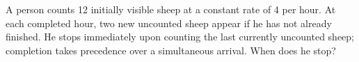 A person counts 12 initially visible sheep at a constant rate of 4 per hour. At each completed hour, two new uncounted sheep appear if he has not already finished. He stops immediately upon counting the last currently uncounted sheep; completion takes precedence over a simultaneous arrival. When does he stop?
